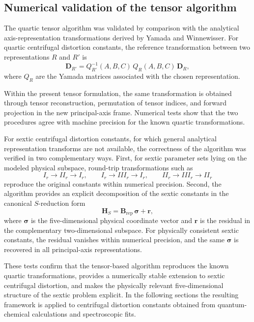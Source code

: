 \subsection{Numerical validation of the tensor algorithm}

The quartic tensor algorithm was validated by comparison with the
analytical axis-representation transformations derived by Yamada and
Winnewisser.\cite{Yamada1976} For quartic centrifugal distortion constants,
the reference transformation between two representations $R$ and $R'$ is
\begin{equation}
\mathbf{D}_{R'} =
Q_{R'}^{-1}(A,B,C)\,Q_R(A,B,C)\,\mathbf{D}_R ,
\end{equation}
where $Q_R$ are the Yamada matrices associated with the chosen
representation.

Within the present tensor formulation, the same transformation is obtained
through tensor reconstruction, permutation of tensor indices, and forward
projection in the new principal-axis frame.  Numerical tests show that the
two procedures agree with machine precision for the known quartic
transformations.

For sextic centrifugal distortion constants, for which general analytical
representation transforms are not available, the correctness of the algorithm
was verified in two complementary ways.  First, for sextic parameter sets
lying on the modeled physical subspace, round-trip transformations such as
\[
I_r \rightarrow II_r \rightarrow I_r,\qquad
I_r \rightarrow III_r \rightarrow I_r,\qquad
II_r \rightarrow III_r \rightarrow II_r
\]
reproduce the original constants within numerical precision.  Second, the
algorithm provides an explicit decomposition of the sextic constants in the
canonical $S$-reduction form
\begin{equation}
\mathbf H_S = \mathbf B_{\mathrm{rep}}\,\boldsymbol\sigma + \mathbf r,
\end{equation}
where $\boldsymbol\sigma$ is the five-dimensional physical coordinate vector
and $\mathbf r$ is the residual in the complementary two-dimensional
subspace.  For physically consistent sextic constants, the residual vanishes
within numerical precision, and the same $\boldsymbol\sigma$ is recovered in
all principal-axis representations.

These tests confirm that the tensor-based algorithm reproduces the known
quartic transformations, provides a numerically stable extension to sextic
centrifugal distortion, and makes the physically relevant five-dimensional
structure of the sextic problem explicit.  In the following sections the
resulting framework is applied to centrifugal distortion constants obtained
from quantum-chemical calculations and spectroscopic fits.

